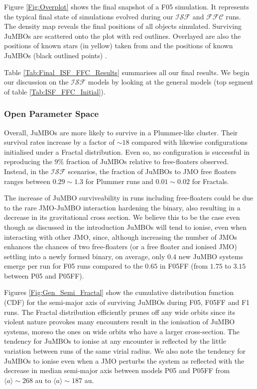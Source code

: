 \documentclass[aa]{aa}
\begin{document}
    Figure \ref{Fig:Overplot} shows the final snapshot of a F05 simulation. It represents the typical final state of simulations evolved during our $\mathcal{ISF}$ and $\mathcal{FFC}$ runs. The density map reveals the final positions of all objects simulated. Surviving JuMBOs are scattered onto the plot with red outlines. Overlayed are also the positions of known stars (in yellow) taken from \citet{2016A&A...595A...1G, 2023A&A...674A...1G} and the positions of known JuMBOs (black outlined points) \citep{2023arXiv231001231P}.

    Table \ref{Tab:Final_ISF_FFC_Results} summarises all our final results. We begin our discussion on the $\mathcal{ISF}$ models by looking at the general models (top segment of table \ref{Tab:ISF_FFC_Initial}). 
     
    \subsubsection{Open Parameter Space}
    Overall, JuMBOs are more likely to survive in a Plummer-like cluster. Their survival rates increase by a factor of $\sim 18$ compared with likewise configurations initialised under a Fractal distribution. Even so, no configuration is successful in reproducing the $9\%$ fraction of JuMBOs relative to free-floaters observed. Instead, in the $\mathcal{ISF}$ scenarios, the fraction of JuMBOs to JMO free floaters ranges between $0.29\sim1.3$ for Plummer runs and $0.01\sim0.02$ for Fractals.
    
    The increase of JuMBO surviveability in runs including free-floaters could be due to the rare JMO-JuMBO interaction hardening the binary, also resulting in a decrease in its gravitational cross section. We believe this to be the case even though as discussed in the introduction JuMBOs will tend to ionise, even when interacting with other JMO, since, although increasing the number of JMOs enhances the chances of two free-floaters (or a free floater and ionised JMO) settling into a newly formed binary, on average, only $0.4$ new JuMBO systems emerge per run for F05 runs compared to the $0.65$ in F05FF (from $1.75$ to $3.15$ between P05 and P05FF). 
    
    Figures \ref{Fig:Gen_Semi_Fractal} show the cumulative distribution function (CDF) for the semi-major axis of surviving JuMBOs during F05, F05FF and F1 runs. The Fractal distribution efficiently prunes off any wide orbits since its violent nature provokes many encounters result in the ionisation of JuMBO systems, moreso the ones on wide orbits who have a larger cross-section. The tendency for JuMBOs to ionise at any encounter is reflected by the little variation between runs of the same virial radius. We also note the tendency for JuMBOs to ionise even when a JMO perturbs the system as reflected with the decrease in median semi-major axis between models P05 and P05FF from $\langle a\rangle\sim268$ au to $\langle a\rangle\sim187$ au.
   
\end{document}
